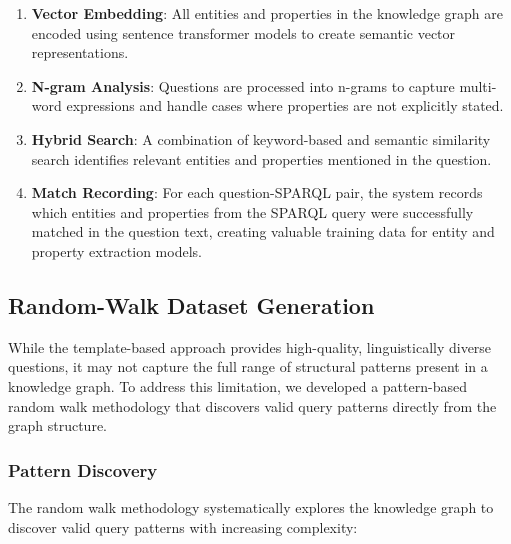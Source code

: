 \begin{enumerate}
    \item \textbf{Vector Embedding}: All entities and properties in the knowledge graph are encoded using sentence transformer models to create semantic vector representations.
    
    \item \textbf{N-gram Analysis}: Questions are processed into n-grams to capture multi-word expressions and handle cases where properties are not explicitly stated.
    
    \item \textbf{Hybrid Search}: A combination of keyword-based and semantic similarity search identifies relevant entities and properties mentioned in the question.
    
    \item \textbf{Match Recording}: For each question-SPARQL pair, the system records which entities and properties from the SPARQL query were successfully matched in the question text, creating valuable training data for entity and property extraction models.
\end{enumerate}

\subsection{Random-Walk Dataset Generation}
While the template-based approach provides high-quality, linguistically diverse questions, it may not capture the full range of structural patterns present in a knowledge graph. To address this limitation, we developed a pattern-based random walk methodology that discovers valid query patterns directly from the graph structure.

\subsubsection{Pattern Discovery}
The random walk methodology systematically explores the knowledge graph to discover valid query patterns with increasing complexity:

